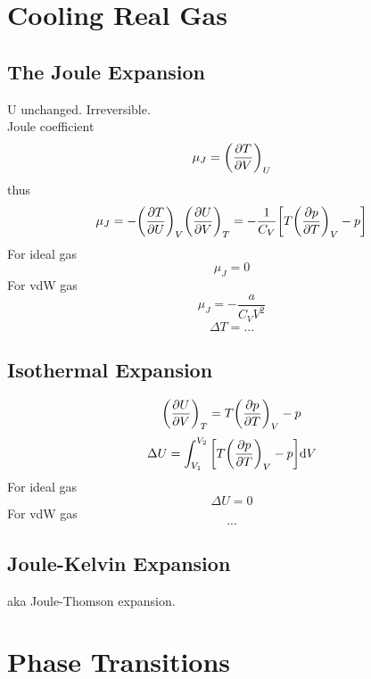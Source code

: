\documentclass[UTF8]{ctexart} %
\numberwithin{equation}{subsection}
\begin{document}
\section{Cooling Real Gas}
\subsection{The Joule Expansion}
U unchanged. Irreversible.\\
Joule coefficient
\begin{equation}\label{key}
\mu_J = \qty(\pdv{T}{V})_U
\end{equation}
thus
\begin{equation}\label{key}
\mu_J = -\qty(\pdv{T}{U})_V\qty(\pdv{U}{V})_T = -\dfrac{1}{C_V}\qty[T\qty(\pdv{p}{T})_V - p]
\end{equation}
For ideal gas
\begin{equation}\label{key}
\mu_J = 0
\end{equation}
For vdW gas
\begin{equation}\label{key}
\mu_J = -\dfrac{a}{C_V V^2}
\end{equation}
\begin{equation}\label{key}
\Delta T = ...
\end{equation}

\subsection{Isothermal Expansion}
\begin{equation}\label{key}
\qty(\pdv{U}{V})_T = T\qty(\pdv{p}{T})_V - p
\end{equation}
\begin{equation}\label{key}
\Delta U = \int_{V_1}^{V_2}\qty[T\qty(\pdv{p}{T})_V - p]\dd V
\end{equation}
For ideal gas
\begin{equation}\label{key}
\Delta U = 0
\end{equation}
For vdW gas
\begin{equation}\label{key}
...
\end{equation}

\subsection{Joule-Kelvin Expansion}
aka Joule-Thomson expansion.


\section{Phase Transitions}
\end{document}
